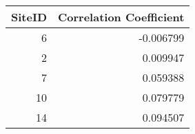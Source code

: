 \begin{tabular}{rr}
\toprule
 SiteID &  Correlation Coefficient \\
\midrule
      6 &                -0.006799 \\
      2 &                 0.009947 \\
      7 &                 0.059388 \\
     10 &                 0.079779 \\
     14 &                 0.094507 \\
\bottomrule
\end{tabular}
